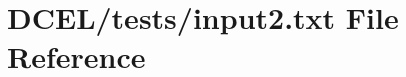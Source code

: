 \hypertarget{input2_8txt}{}\section{D\+C\+E\+L/tests/input2.txt File Reference}
\label{input2_8txt}
